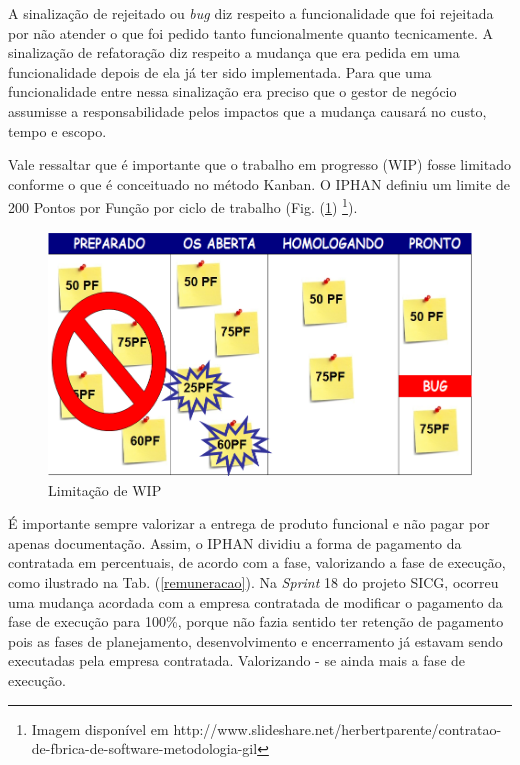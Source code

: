 A sinalização de rejeitado ou \textit{bug} diz respeito a funcionalidade que foi rejeitada por não atender o que foi pedido tanto funcionalmente quanto tecnicamente. A sinalização de refatoração diz respeito a mudança que era pedida em uma funcionalidade depois de ela já ter sido implementada. Para que uma funcionalidade entre nessa sinalização era preciso que o gestor de negócio assumisse a responsabilidade pelos impactos que a mudança causará no custo, tempo e escopo.

Vale ressaltar que é importante que o trabalho em progresso (WIP) fosse limitado conforme o que é conceituado no método Kanban. O IPHAN definiu um limite de 200 Pontos por Função por ciclo de trabalho (Fig. (\ref{kanban4}) \footnote{Imagem disponível em http://www.slideshare.net/herbertparente/contratao-de-fbrica-de-software-metodologia-gil}). 

\begin{figure}[h]
		\centering
		
			\includegraphics[scale=0.5]{figuras/kanbanIPHAN4.png}
		\caption{Limitação de WIP}
		\label{kanban4}
\end{figure}

É importante sempre valorizar a entrega de produto funcional e não pagar por apenas documentação. Assim, o IPHAN dividiu a forma de pagamento da contratada em percentuais, de acordo com a fase, valorizando a fase de execução, como ilustrado na Tab. (\ref{remuneracao}). Na \textit{Sprint} 18 do projeto SICG, ocorreu uma mudança acordada com a empresa contratada de modificar o pagamento da fase de execução para 100\%, porque não fazia sentido ter retenção de pagamento pois as fases de planejamento, desenvolvimento e encerramento já estavam sendo executadas pela empresa contratada. Valorizando - se ainda mais a fase de execução.


